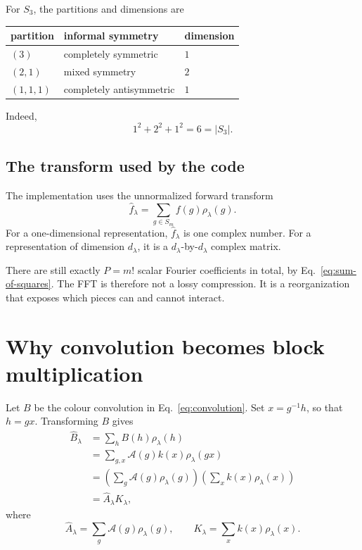 \documentclass[11pt,a4paper]{article}
\newcommand{\cA}{\mathcal{A}}
\begin{document}
For $S_3$, the partitions and dimensions are
\begin{center}
\begin{tabular}{lll}
  \toprule
  partition & informal symmetry & dimension \\
  \midrule
  $(3)$ & completely symmetric & $1$ \\
  $(2,1)$ & mixed symmetry & $2$ \\
  $(1,1,1)$ & completely antisymmetric & $1$ \\
  \bottomrule
\end{tabular}
\end{center}
Indeed,
\begin{equation}
  1^2+2^2+1^2=6=|S_3|.
\end{equation}

\subsection{The transform used by the code}

The implementation uses the unnormalized forward transform
\begin{equation}
  \widehat f_\lambda
  =\sum_{g\in S_m}f(g)\rho_\lambda(g).
  \label{eq:forward-transform}
\end{equation}
For a one-dimensional representation, $\widehat f_\lambda$ is one complex
number.  For a representation of dimension $d_\lambda$, it is a
$d_\lambda$-by-$d_\lambda$ complex matrix.

There are still exactly $P=m!$ scalar Fourier coefficients in total, by
Eq.~\eqref{eq:sum-of-squares}.  The FFT is therefore not a lossy compression.
It is a reorganization that exposes which pieces can and cannot interact.

\section{Why convolution becomes block multiplication}

Let $B$ be the colour convolution in Eq.~\eqref{eq:convolution}.  Set
$x=g^{-1}h$, so that $h=gx$.  Transforming $B$ gives
\begin{align}
  \widehat B_\lambda
  &=\sum_h B(h)\rho_\lambda(h) \\
  &=\sum_{g,x}\cA(g)k(x)\rho_\lambda(gx) \\
  &=\left(\sum_g\cA(g)\rho_\lambda(g)\right)
    \left(\sum_x k(x)\rho_\lambda(x)\right) \\
  &=\widehat A_\lambda K_\lambda,
  \label{eq:convolution-theorem}
\end{align}
where
\begin{equation}
  \widehat A_\lambda=\sum_g\cA(g)\rho_\lambda(g),
  \qquad
  K_\lambda=\sum_x k(x)\rho_\lambda(x).
\end{equation}
\end{document}
